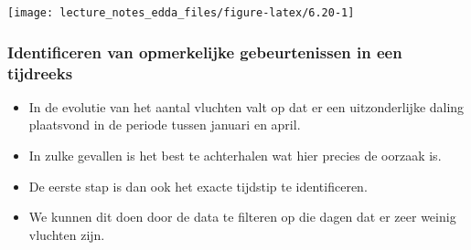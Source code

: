 \documentclass[]{memoir}
\newenvironment{Shaded}{\begin{snugshade}}{\end{snugshade}}
\newcommand{\DataTypeTok}[1]{\textcolor[rgb]{0.13,0.29,0.53}{#1}}
\newcommand{\DecValTok}[1]{\textcolor[rgb]{0.00,0.00,0.81}{#1}}
\newcommand{\KeywordTok}[1]{\textcolor[rgb]{0.13,0.29,0.53}{\textbf{#1}}}
\newcommand{\NormalTok}[1]{#1}
\newcommand{\OperatorTok}[1]{\textcolor[rgb]{0.81,0.36,0.00}{\textbf{#1}}}
\newcommand{\StringTok}[1]{\textcolor[rgb]{0.31,0.60,0.02}{#1}}
\providecommand{\tightlist}{%
  \setlength{\itemsep}{0pt}\setlength{\parskip}{0pt}}
\begin{document}
\begin{Shaded}
\end{Shaded}

\texttt{[image: lecture\_notes\_edda\_files/figure-latex/6.20-1]}

\hypertarget{identificeren-van-opmerkelijke-gebeurtenissen-in-een-tijdreeks}{%
\subsubsection{Identificeren van opmerkelijke gebeurtenissen in een tijdreeks}\label{identificeren-van-opmerkelijke-gebeurtenissen-in-een-tijdreeks}}

\begin{itemize}
\tightlist
\item
  In de evolutie van het aantal vluchten valt op dat er een uitzonderlijke daling plaatsvond in de periode tussen januari en april.
\item
  In zulke gevallen is het best te achterhalen wat hier precies de oorzaak is.
\item
  De eerste stap is dan ook het exacte tijdstip te identificeren.
\item
  We kunnen dit doen door de data te filteren op die dagen dat er zeer weinig vluchten zijn.
\end{itemize}

\begin{Shaded}
\end{Shaded}
\end{document}
